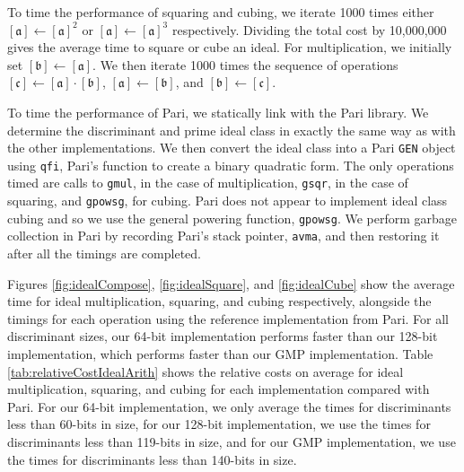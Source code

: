 \documentclass{ucalgthes1}
\theoremstyle{definition}
\newcommand{\ideal}{\mathfrak}
\newcommand{\idealclass}[1]{\left[ \ideal #1 \right]}
\newcommand{\aclass}{\idealclass a}
\newcommand{\bclass}{\idealclass b}
\newcommand{\cclass}{\idealclass c}
\begin{document}
To time the performance of squaring and cubing, we iterate 1000 times either $[\mathfrak a] \gets [\mathfrak a]^2$ or $\aclass \gets [\mathfrak a]^3$ respectively.  Dividing the total cost by 10,000,000 gives the average time to square or cube an ideal.  For multiplication, we initially set $\bclass \gets [\mathfrak a]$.  We then iterate 1000 times the sequence of operations $\cclass \gets \aclass \cdot \bclass$, $\aclass \gets \bclass$, and $\bclass \gets \cclass$.

To time the performance of Pari, we statically link with the Pari library.  We determine the discriminant and prime ideal class in exactly the same way as with the other implementations.  We then convert the ideal class into a Pari \texttt{GEN} object using \texttt{qfi}, Pari's function to create a binary quadratic form.  The only operations timed are calls to \texttt{gmul}, in the case of multiplication, \texttt{gsqr}, in the case of squaring, and \texttt{gpowsg}, for cubing.  Pari does not appear to implement ideal class cubing and so we use the general powering function, \texttt{gpowsg}.  We perform garbage collection in Pari by recording Pari's stack pointer, \texttt{avma}, and then restoring it after all the timings are completed.

Figures \ref{fig:idealCompose}, \ref{fig:idealSquare}, and \ref{fig:idealCube} show the average time for ideal multiplication, squaring, and cubing respectively, alongside the timings for each operation using the reference implementation from Pari.  For all discriminant sizes, our 64-bit implementation performs faster than our 128-bit implementation, which performs faster than our GMP implementation.  Table \ref{tab:relativeCostIdealArith} shows the relative costs on average for ideal multiplication, squaring, and cubing for each implementation compared with Pari. For our 64-bit implementation, we only average the times for discriminants less than 60-bits in size, for our 128-bit implementation, we use the times for discriminants less than 119-bits in size, and for our GMP implementation, we use the times for discriminants less than 140-bits in size.
\end{document}
